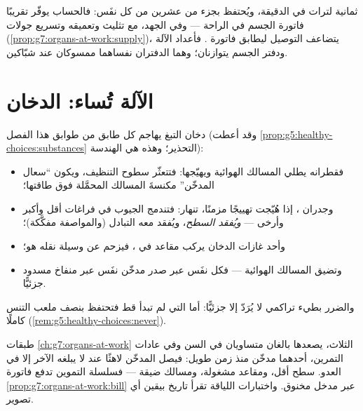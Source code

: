 \begin{example}\label{ex:g7:lungs-and-gas-exchange:accounting}
ثمانية لترات في الدقيقة، ويُحتفظ بجزء من عشرين من  كل نفَس:
فالحساب يوفّر تقريبًا فاتورة  الجسم في الراحة --- وفي الجهد،
مع تثليث  وتعميقه وتسريع جولات 
(\cref{prop:g7:organs-at-work:supply})، يتضاعف التوصيل ليطابق
فاتورة . فأعداد الآلة ودفتر الجسم يتوازنان؛ وهما الدفتران
نفساهما ممسوكان عند شبّاكين.
\end{example}

\section{الآلة تُساء: الدخان}

\begin{proposition}\label{prop:g7:lungs-and-gas-exchange:smoke}
دخان التبغ يهاجم كل طابق من طوابق هذا الفصل
(وقد أعطت \cref{prop:g5:healthy-choices:substances} التحذير؛ وهذه
هي الهندسة):
\begin{itemize}
  \item فقطرانه يطلي المسالك الهوائية ويهيّجها: فتتعثّر سطوح
        التنظيف، ويكون ``سعال المدخّن'' مكنسةَ المسالك المحمَّلة
        فوق طاقتها؛
  \item وجدران ، إذا هُيّجت تهييجًا مزمنًا، تنهار: فتندمج
        الجيوب في فراغات أقل وأكبر وأرخى --- \emph{ويُفقد السطح}،
        ويُفقد معه التبادل (والمواصفة مفكَّكة)؛
  \item وأحد غازات الدخان يركب مقاعد  في ، فيزحم
         عن وسيلة نقله هو؛
  \item وتضيق المسالك الهوائية --- فكل نفَس عبر صدر مدخّن نفَس
        عبر منفاخ مسدود جزئيًّا.
\end{itemize}
والضرر بطيء تراكمي لا يُرَدّ إلا جزئيًّا: أما  التي لم تبدأ قط
فتحتفظ بنصف ملعب التنس كاملًا (\cref{rem:g5:healthy-choices:never}).
\end{proposition}
\admitted

\begin{example}\label{ex:g7:lungs-and-gas-exchange:stairs}
طبقات \cref{ch:g7:organs-at-work} الثلاث، يصعدها بالغان متساويان في
السن وفي عادات التمرين، أحدهما مدخّن منذ زمن طويل: فيصل المدخّن
لاهثًا عند  لا يبلغه الآخر إلا في العدو. سطح أقل، ومقاعد
مشغولة، ومسالك ضيقة --- فسلسلة التموين تدفع فاتورة
\cref{prop:g7:organs-at-work:bill} عبر مدخل مخنوق. واختبارات
اللياقة تقرأ تاريخ  بيقين أي تصوير.
\end{example}

